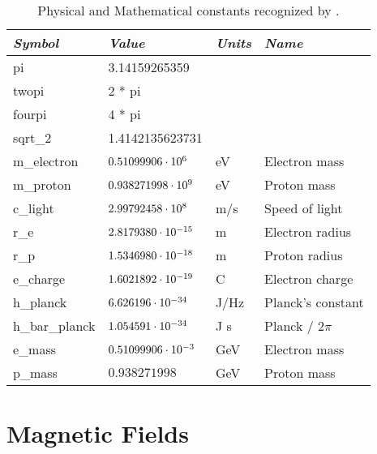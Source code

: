 \begin{table}
\centering
\begin{tabular}{|l|l|l|l|} \hline
  {\em Symbol}   & {\em Value}       & {\em Units} &  {\em Name}     \\ \hline
  pi             & 3.14159265359          &        &                   \\
  twopi          & 2 * pi                 &        &                   \\
  fourpi         & 4 * pi                 &        &                   \\
  sqrt\_2        & 1.4142135623731        &        &                   \\
  m\_electron    & $0.51099906 \cdot 10^{6}$   & eV     & Electron mass     \\
  m\_proton      & $0.938271998 \cdot 10^{9}$  & eV     & Proton mass       \\
  c\_light       & $2.99792458 \cdot 10^{8}$   & m/s    & Speed of light    \\
  r\_e           & $2.8179380 \cdot 10^{-15}$  & m      & Electron radius   \\
  r\_p           & $1.5346980 \cdot 10^{-18}$  & m      & Proton radius     \\
  e\_charge      & $1.6021892 \cdot 10^{-19}$  & C      & Electron charge   \\
  h\_planck      & $6.626196 \cdot 10^{-34}$   & J/Hz   & Planck's constant \\
  h\_bar\_planck & $1.054591 \cdot 10^{-34}$   & J s    & Planck / $2\pi$   \\
  e\_mass        & $0.51099906 \cdot 10^{-3}$  & GeV    & Electron mass     \\
  p\_mass        & $0.938271998$          & GeV    & Proton mass     \\ \hline
\end{tabular}
\caption{Physical and Mathematical constants recognized by \bmad.}
\label{t:constants}
\end{table}


\section{Magnetic Fields}
\label{s:fields}

